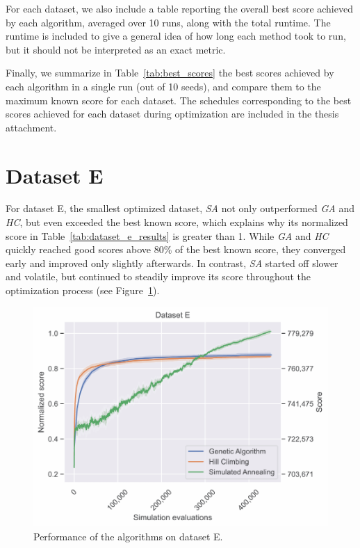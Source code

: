 For each dataset, we also include a table reporting the overall best score achieved by each algorithm, averaged over 10 runs, along with the total runtime. The runtime is included to give a general idea of how long each method took to run, but it should not be interpreted as an exact metric.

Finally, we summarize in Table~\ref{tab:best_scores} the best scores achieved by each algorithm in a single run (out of 10 seeds), and compare them to the maximum known score for each dataset. The schedules corresponding to the best scores achieved for each dataset during optimization are included in the thesis attachment.

\newpage
\section{Dataset E} \label{sec:dataset_e}

For dataset E, the smallest optimized dataset, \textit{SA} not only outperformed \textit{GA} and \textit{HC}, but even exceeded the best known score, which explains why its normalized score in Table~\ref{tab:dataset_e_results} is greater than 1. While \textit{GA} and \textit{HC} quickly reached good scores above 80\% of the best known score, they converged early and improved only slightly afterwards. In contrast, \textit{SA} started off slower and volatile, but continued to steadily improve its score throughout the optimization process (see Figure~\ref{fig:dataset_e_experiment}).

\bigskip

\begin{figure}[h]
    \centering
    \includegraphics[width=\linewidth]{img/experiments/pdfa-e_Genetic Algorithm_Hill Climbing_Simulated Annealing.pdf}
    \caption[Performance of the algorithms on dataset E]{
        Performance of the algorithms on dataset E.
    }
    \label{fig:dataset_e_experiment}
\end{figure}

